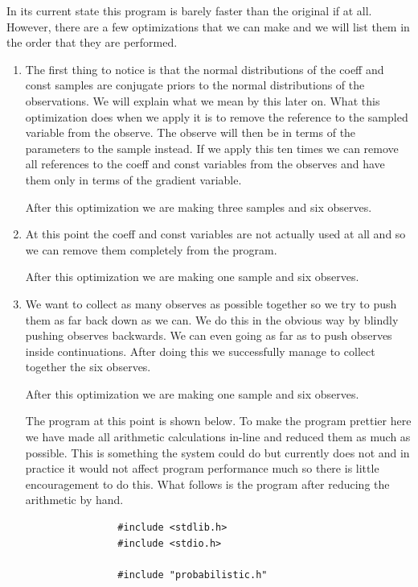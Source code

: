 \documentclass[a4paper]{article}
\begin{document}
In its current state this program is barely faster than the original if at all. However, there are a few optimizations that we can make and we will list them in the order that they are performed.
\begin{enumerate}
\item
	The first thing to notice is that the normal distributions of the coeff and const samples are conjugate priors to the normal distributions of the observations. We will explain what we mean by this later on. What this optimization does when we apply it is to remove the reference to the sampled variable from the observe. The observe will then be in terms of the parameters to the sample instead. If we apply this ten times we can remove all references to the coeff and const variables from the observes and have them only in terms of the gradient variable.

	After this optimization we are making three samples and six observes.

\item
	At this point the coeff and const variables are not actually used at all and so we can remove them completely from the program.

	After this optimization we are making one sample and six observes.

\item
	We want to collect as many observes as possible together so we try to push them as far back down as we can. We do this in the obvious way by blindly pushing observes backwards. We can even going as far as to push observes inside continuations. After doing this we successfully manage to collect together the six observes.

	After this optimization we are making one sample and six observes.

	The program at this point is shown below. To make the program prettier here we have made all arithmetic calculations in-line and reduced them as much as possible. This is something the system could do but currently does not and in practice it would not affect program performance much so there is little encouragement to do this. What follows is the program after reducing the arithmetic by hand.

	\begin{center}
		\begin{varwidth}{\linewidth}
			\small
			\begin{verbatim}
				#include <stdlib.h>
				#include <stdio.h>

				#include "probabilistic.h"


\end{verbatim}
\end{varwidth}
\end{center}
\end{enumerate}
\end{document}
